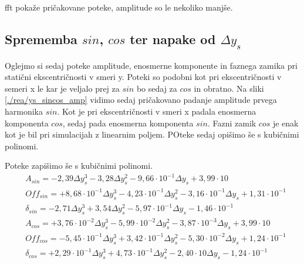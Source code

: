 
fft pokaže pričakovane poteke, amplitude so le nekoliko manjše.

\newpage
\subsection{Sprememba $sin$, $cos$ ter napake od $\Delta y_s$}

Oglejmo si sedaj poteke amplitude, enosmerne komponente in faznega zamika pri statični ekscentričnosti v smeri y. Poteki so podobni kot pri ekscentričnosti v semeri x le kar je veljalo prej za $sin$ bo sedaj za $cos$ in obratno. Na sliki \ref{./rea/ys_sincos_amp} vidimo sedaj pričakovano padanje amplitude prvega harmonika $sin$. Kot je pri ekscentričnosti v smeri x padala enosmerna komponenta $cos$, sedaj pada enosmerna komponenta $sin$. Fazni zamik $cos$ je enak kot je bil pri simulacijah z linearnim poljem. POteke sedaj opišimo še s kubičnimi polinomi.

Poteke zapišimo še s kubičnimi polinomi.
\begin{eqnarray}
&A_{sin} = -2,39\Delta y_s^3-3,28\Delta y_s^2-9,66\cdot 10^{-1}\Delta y_s+3,99\cdot 10\\     
&Off_{sin} = +8,68\cdot 10^{-1}\Delta y_s^3-4,23\cdot 10^{-1}\Delta y_s^2-3,16\cdot 10^{-1}\Delta y_s+1,31\cdot 10^{-1}\\   
&\delta_{sin} = -2,71\Delta y_s^3+3,54\Delta y_s^2-5,97\cdot 10^{-1}\Delta y_s-1,46\cdot 10^{-1}\\
&A_{cos} = +3,76\cdot 10^{-2}\Delta y_s^3-5,99\cdot 10^{-2}\Delta y_s^2-3,87\cdot 10^{-3}\Delta y_s+3,99\cdot 10\\     
&Off_{cos} = -5,45\cdot 10^{-1}\Delta y_s^3+3,42\cdot 10^{-1}\Delta y_s^2-5,30\cdot 10^{-2}\Delta y_s+1,24\cdot 10^{-1}\\   
&\delta_{cos} = +2,29\cdot 10^{-1}\Delta y_s^3+4,73\cdot 10^{-1}\Delta y_s^2-2,40\cdot 10\Delta y_s-1,24\cdot 10^{-1}  
\end{eqnarray}

